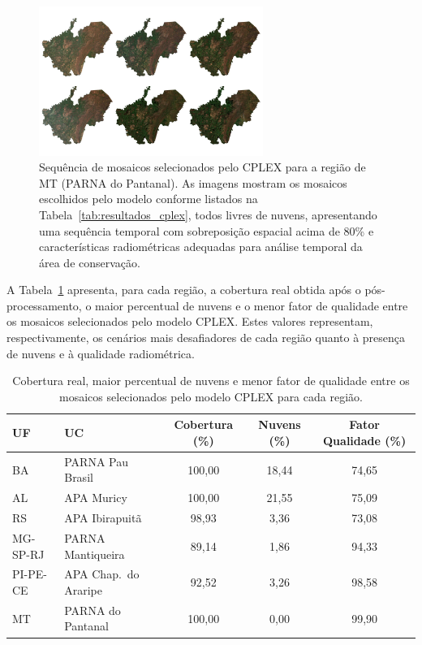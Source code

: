 \documentclass[a4paper,11pt]{article}
\begin{document}
\begin{figure}[H]
    \centering
    \includegraphics[width=0.65\textwidth]{./img/mosaic_mg_plot.jpg}
    \caption{Sequência de mosaicos selecionados pelo CPLEX para a região de MT (PARNA do Pantanal). As imagens mostram os mosaicos escolhidos pelo modelo conforme listados na Tabela~\ref{tab:resultados_cplex}, todos livres de nuvens, apresentando uma sequência temporal com sobreposição espacial acima de 80\% e características radiométricas adequadas para análise temporal da área de conservação.}
    \label{fig:intersecoes}
\end{figure}

\vspace{-5mm}

A Tabela~\ref{tab:cobertura_comparacao} apresenta, para cada região, a cobertura real obtida após o pós-processamento, o maior percentual de nuvens e o menor fator de qualidade entre os mosaicos selecionados pelo modelo CPLEX. Estes valores representam, respectivamente, os cenários mais desafiadores de cada região quanto à presença de nuvens e à qualidade radiométrica.

\vspace{-6mm}
\begin{table}[H]
    \centering
    \caption{Cobertura real, maior percentual de nuvens e menor fator de qualidade entre os mosaicos selecionados pelo modelo CPLEX para cada região.}
    \label{tab:cobertura_comparacao}
    \footnotesize
    \begin{adjustbox}{width=\textwidth}
    \begin{tabular}{llccc}
        \toprule
        \textbf{UF} & \textbf{UC} & \textbf{Cobertura (\%)} & \textbf{Nuvens (\%)} & \textbf{Fator Qualidade (\%)} \\
        \midrule
        BA      & PARNA Pau Brasil         & 100,00 & 18,44 & 74,65 \\
        AL      & APA Muricy               & 100,00 & 21,55 & 75,09 \\
        RS      & APA Ibirapuitã           & 98,93  & 3,36  & 73,08 \\
        MG-SP-RJ& PARNA Mantiqueira        & 89,14  & 1,86  & 94,33 \\
        PI-PE-CE& APA Chap.\ do Araripe    & 92,52  & 3,26  & 98,58 \\
        MT      & PARNA do Pantanal        & 100,00 & 0,00  & 99,90 \\
        \bottomrule
    \end{tabular}
    \end{adjustbox}
    \normalsize
\end{table}
\vspace{-5mm}
\end{document}
